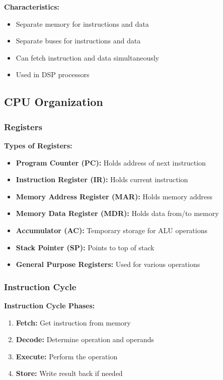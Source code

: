 \documentclass[11pt,a4paper]{article}
\begin{document}
\textbf{Characteristics:}
\begin{itemize}
    \item Separate memory for instructions and data
    \item Separate buses for instructions and data
    \item Can fetch instruction and data simultaneously
    \item Used in DSP processors
\end{itemize}

\subsection{CPU Organization}

\subsubsection{Registers}

\textbf{Types of Registers:}
\begin{itemize}
    \item \textbf{Program Counter (PC):} Holds address of next instruction
    \item \textbf{Instruction Register (IR):} Holds current instruction
    \item \textbf{Memory Address Register (MAR):} Holds memory address
    \item \textbf{Memory Data Register (MDR):} Holds data from/to memory
    \item \textbf{Accumulator (AC):} Temporary storage for ALU operations
    \item \textbf{Stack Pointer (SP):} Points to top of stack
    \item \textbf{General Purpose Registers:} Used for various operations
\end{itemize}

\subsubsection{Instruction Cycle}

\begin{defbox}
\textbf{Instruction Cycle Phases:}
\begin{enumerate}
    \item \textbf{Fetch:} Get instruction from memory
    \item \textbf{Decode:} Determine operation and operands
    \item \textbf{Execute:} Perform the operation
    \item \textbf{Store:} Write result back if needed
\end{enumerate}
\end{defbox}
\end{document}
